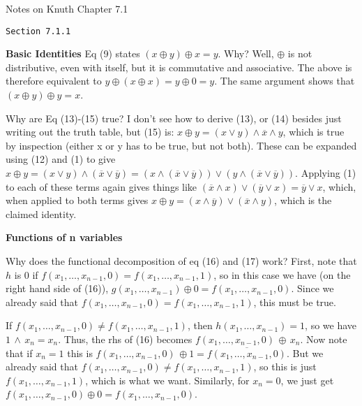 \topglue 0.5in
\centerline{Notes on Knuth Chapter 7.1}
\vskip 0.3in
\centerline{\tt Section 7.1.1}
\vskip 0.2in

\noindent
{\bf Basic Identities} \hfil\break
\vskip 0.05in
\noindent [p 50] Eq (9) states $\left( x \oplus y \right)
\oplus x = y$.  Why?  \hfil\break
Well, $\oplus$ is not distributive, even with itself,
but it is commutative and associative. The above is therefore
equivalent to $y \oplus \left( x \oplus x \right) = y \oplus 0 = y$.
The same argument shows that $\left( x \oplus y \right) \oplus y = x$.

\vskip 0.05in
\noindent [p 51] Why are Eq (13)-(15) true? \hfil\break
I don't see how to derive (13), or (14) besides just writing out the truth table, but (15) is:
$x \oplus y = \left(x \vee y\right) \wedge \overline x \wedge y$, which
is true by inspection (either x or y has to be true, but not both).
These can be expanded using (12) and (1) to give
$x \oplus y = \left(x \vee y\right) \wedge \left(\overline{x} \vee \overline{y}
\right) = \left(x \wedge \left(\overline{x} \vee \overline{y}\right)\right)
\vee \left(y \wedge \left(\overline{x} \vee \overline{y}\right)\right)$.
Applying (1) to each of these terms again gives things like
$\left(\overline{x} \wedge x\right) \vee \left(\overline{y} \vee x\right) =
\overline{y} \vee x$, which, when applied to both terms gives
$x \oplus y = \left(x \wedge \overline{y}\right) \vee \left(\overline{x}
\wedge y\right)$, which is the claimed identity.

\vskip 0.1in
\noindent
{\bf Functions of n variables} \hfil\break

\noindent [p51] Why does the functional decomposition
of eq (16) and (17) work? \hfil\break
First, note that $h$ is 0 if
$f\left(x_1,\ldots,x_{n-1},0\right) = f\left( x_1,\ldots,x_{n-1},1\right)$, so
in this case we have (on the right hand side of (16)),
 $g\left(x_1,\ldots,x_{n-1}\right) \oplus 0 = f\left(x_1,\ldots,x_{n-1},0\right)$.
 Since we already said that $f\left(x_1,\ldots,x_{n-1},0\right) = f\left( x_1,\ldots,x_{n-1},1\right)$, this must be true.  
 
If $f\left(x_1,\ldots,x_{n-1},0\right) \neq f\left( x_1,\ldots,x_{n-1},1\right)$,
then $h\left(x_1,\ldots,x_{n-1}\right)=1$, so we have $1\, \wedge\, x_n
= x_n$.  Thus, the rhs of (16) becomes $f\left(x_1,\ldots,x_{n-1},0\right) 
\, \oplus \, x_n$.  Now note that if $x_n = 1$ this is
$f\left(x_1,\ldots,x_{n-1},0\right) \, \oplus 1 = 
\overline{f\left(x_1,\ldots,x_{n-1},0\right)}$.  But we already said that
$f\left(x_1,\ldots,x_{n-1},0\right) \neq f\left( x_1,\ldots,x_{n-1},1\right)$,
so this is just $f\left(x_1,\ldots,x_{n-1},1\right)$, which is what we want.
Similarly, for $x_n = 0$, we just get
$f\left(x_1,\ldots,x_{n-1},0\right) \oplus 0 = f\left(x_1,\ldots,x_{n-1},0\right)$.

